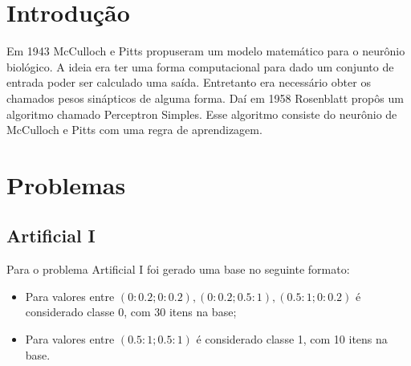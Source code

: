 \section{Introdução}\label{introduuxe7uxe3o}

Em 1943 McCulloch e Pitts propuseram um modelo matemático para o
neurônio biológico. A ideia era ter uma forma computacional para dado um
conjunto de entrada poder ser calculado uma saída. Entretanto era
necessário obter os chamados pesos sinápticos de alguma forma. Daí em
1958 Rosenblatt propôs um algoritmo chamado Perceptron Simples. Esse
algoritmo consiste do neurônio de McCulloch e Pitts com uma regra de
aprendizagem.

\section{Problemas}\label{problemas}

\subsection{Artificial I}\label{artificial-i}

Para o problema Artificial I foi gerado uma base no seguinte formato:

\begin{itemize}
\tightlist
\item
  Para valores entre
  \((0 : 0.2; 0 : 0.2), (0 : 0.2; 0.5 : 1), (0.5 : 1; 0 : 0.2)\) é
  considerado classe 0, com 30 itens na base;
\item
  Para valores entre \((0.5 : 1; 0.5 : 1)\) é considerado classe 1, com
  10 itens na base.
\end{itemize}

\begin{Shaded}
\end{Shaded}


